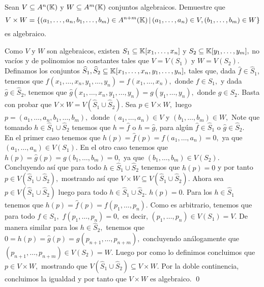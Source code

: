 \begin{homeworkProblem}
    Sean $V\subseteq A^n(\mathbb{K})$ y $W\subseteq A^m(\mathbb{K})$ conjuntos algebraicos. Demuestre que
    $$V\times W=\{(a_1,\ldots,a_n,b_1,\ldots,b_m)\in A^{n+m}(\mathbb{K})\,|\,(a_1,\ldots,a_n)\in V,(b_1,\ldots,b_m)\in W\}$$
    es algebraico.
    \begin{solucion}
        Como $V$ y $W$ son algebraicos, existen $S_1\subseteq \mathbb{K}[x_1,\ldots,x_n]$ y $S_2\subseteq \mathbb{K}[y_1,\ldots,y_m],$ no vacíos y de polinomios no constantes tales que $V=V(S_1)$ y $W=V(S_2).$ Definamos los conjuntos $\widehat{S}_1,\widehat{S}_2\subseteq \mathbb{K}[x_1,\ldots,x_n,y_1,\ldots,y_n],$ tales que, dada $\hat{f}\in \widehat{S}_1$, tenemos que $\hat{f}(x_1,\ldots,x_n,y_1,\ldots,y_n)=f(x_1,\ldots,x_n),$ donde $f\in S_1,$ y dada $\hat{g}\in\widehat{S}_2$, tenemos que $\hat{g}(x_1,\ldots,x_n,y_1,\ldots,y_n)=g(y_1,\ldots,y_n),$ donde $g\in S_2.$ Basta con probar que $V\times W=V(\widehat{S}_1\cup\widehat{S}_2).$ Sea $p\in V\times W,$ luego $p=(a_1,\ldots,a_n,b_1,\ldots,b_m),$ donde $(a_1,\ldots,a_n)\in V$ y $(b_1,\ldots,b_m)\in W,$ Note que tomando $h\in \widehat{S}_1\cup\widehat{S}_2 $ tenemos que $h=\hat{f}$ o $h=\hat{g}$, para algún $\hat{f}\in \widehat{S}_1$ o $\hat{g}\in\widehat{S}_2.$\\
        En el primer caso tenemos que $h(p)=\hat{f}(p)=f(a_1,\ldots,a_n)=0,$ ya que $(a_1,\ldots,a_n)\in V(S_1).$ En el otro caso tenemos que $h(p)=\hat{g}(p)=g(b_1,\ldots,b_m)=0,$ ya que $(b_1,\ldots,b_m)\in V(S_2).$ Concluyendo así que para todo $h\in \widehat{S}_1\cup\widehat{S}_2$ tenemos que $h(p)=0$ y por tanto $p\in V(\widehat{S}_1\cup\widehat{S}_2),$ mostrando así que $V\times W\subseteq V(\widehat{S}_1\cup\widehat{S}_2).$ Ahora sea $p\in V(\widehat{S}_1\cup\widehat{S}_2)$ luego para todo $h\in \widehat{S}_1\cup\widehat{S}_2 .$ $h(p)=0.$ Para los $h\in \widehat{S}_1 $ tenemos que $h(p)=\hat{f}(p)=f(p_1,\ldots,p_n).$ Como es arbitrario, tenemos que para todo $f\in S_1,$ $f(p_1,\ldots,p_n)=0,$ es decir, $(p_1,\ldots,p_n)\in V(S_1)=V.$ De manera similar para los $h\in \widehat{S}_2,$ tenemos que $0=h(p)=\hat{g}(p)=g(p_{n+1},\ldots,p_{n+m}),$ concluyendo análogamente que $(p_{n+1},\ldots,p_{n+m})\in V(S_2)=W.$ Luego por como lo definimos concluimos que $p\in V\times W,$ mostrando que $V(\widehat{S}_1\cup\widehat{S}_2) \subseteq V\times W.$ Por la doble continencia, concluimos la igualdad y por tanto que $V\times W$ es algebraico. \qed
    \end{solucion}
\end{homeworkProblem}


